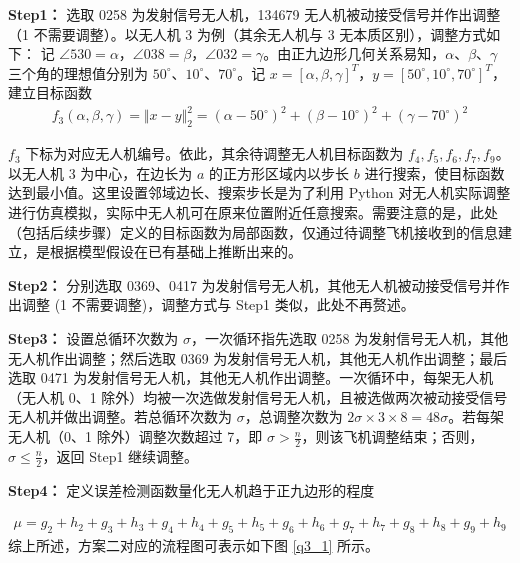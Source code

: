 \documentclass[withoutpreface,bwprint]{cumcmthesis} %
\begin{document}
\textbf{Step1：} 选取 0258 为发射信号无人机，134679 无人机被动接受信号并作出调整（1 不需要调整）。以无人机 3 为例（其余无人机与 3 无本质区别），调整方式如下：
记 $\angle 530 = \alpha$，$\angle 038 = \beta$，$\angle 032 = \gamma$。由正九边形几何关系易知，$\alpha$、$\beta$、$\gamma$ 三个角的理想值分别为 $50^\circ$、$10^\circ$、$70^\circ$。记 $x = [\alpha, \beta, \gamma]^T$，$y = [50^\circ, 10^\circ, 70^\circ]^T$，建立目标函数
\begin{align}
    f_3(\alpha, \beta, \gamma) = \Vert{x} - {y}\Vert_2^2 = (\alpha - 50^\circ)^2 + (\beta - 10^\circ)^2 + (\gamma - 70^\circ)^2
\end{align}

$f_3$ 下标为对应无人机编号。依此，其余待调整无人机目标函数为 $f_4, f_5, f_6, f_7, f_9$。以无人机 3 为中心，在边长为 $a$ 的正方形区域内以步长 $b$ 进行搜索，使目标函数达到最小值。这里设置邻域边长、搜索步长是为了利用 Python 对无人机实际调整进行仿真模拟，实际中无人机可在原来位置附近任意搜索。需要注意的是，此处（包括后续步骤）定义的目标函数为局部函数，仅通过待调整飞机接收到的信息建立，是根据模型假设在已有基础上推断出来的。

\textbf{Step2：} 分别选取 0369、0417 为发射信号无人机，其他无人机被动接受信号并作出调整 (1 不需要调整)，调整方式与 Step1 类似，此处不再赘述。

\textbf{Step3：} 设置总循环次数为 $\sigma$，一次循环指先选取 0258 为发射信号无人机，其他无人机作出调整；然后选取 0369 为发射信号无人机，其他无人机作出调整；最后选取 0471 为发射信号无人机，其他无人机作出调整。一次循环中，每架无人机（无人机 0、1 除外）均被一次选做发射信号无人机，且被选做两次被动接受信号无人机并做出调整。若总循环次数为 $\sigma$，总调整次数为 $2\sigma \times 3 \times 8 = 48\sigma$。若每架无人机（0、1 除外）调整次数超过 7，即 $\sigma > \frac{n}{2}$，则该飞机调整结束；否则，$\sigma \leq \frac{n}{2}$，返回 Step1 继续调整。

\textbf{Step4：} 定义误差检测函数量化无人机趋于正九边形的程度

\begin{align}
\mu = g_2 + h_2 + g_3 + h_3 + g_4 + h_4 + g_5 + h_5 + g_6 + h_6 + g_7 + h_7 + g_8 + h_8 + g_9 + h_9
\end{align}
综上所述，方案二对应的流程图可表示如下图 \ref{q3_1} 所示。




    
\end{document}
